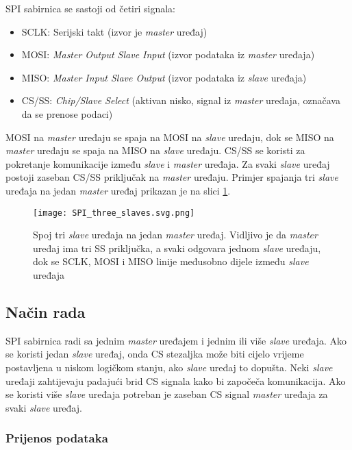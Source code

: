 SPI sabirnica se sastoji od četiri signala:
\begin{itemize}
	\item SCLK: Serijski takt (izvor je \textit{master} uređaj)
	\item MOSI: \textit{Master Output Slave Input} (izvor podataka iz \textit{master} uređaja)
	\item MISO: \textit{Master Input Slave Output} (izvor podataka iz \textit{slave} uređaja)
	\item CS/SS: \textit{Chip/Slave Select} (aktivan nisko, signal iz \textit{master} uređaja, označava da se prenose podaci)
\end{itemize}
MOSI na \textit{master} uređaju se spaja na MOSI na \textit{slave} uređaju, dok se MISO na \textit{master} uređaju se spaja na MISO na \textit{slave} uređaju. CS/SS se koristi za pokretanje komunikacije između \textit{slave} i \textit{master} uređaja. Za svaki \textit{slave} uređaj postoji zaseban CS/SS priključak na \textit{master} uređaju. Primjer spajanja tri \textit{slave} uređaja na jedan \textit{master} uređaj prikazan je na slici \ref{fig:spi_three_slaves}.
\begin{figure}[H]
	\centering
	\texttt{[image: SPI\_three\_slaves.svg.png]}
	\caption{Spoj tri \textit{slave} uređaja na jedan \textit{master} uređaj. Vidljivo je da \textit{master} uređaj ima tri SS priključka, a svaki odgovara jednom \textit{slave} uređaju, dok se SCLK, MOSI i MISO linije međusobno dijele između \textit{slave} uređaja \cite{spi_wikipedia}}
	\label{fig:spi_three_slaves}
\end{figure}

\subsection{Način rada}

SPI sabirnica radi sa jednim \textit{master} uređajem i jednim ili više \textit{slave} uređaja. Ako se koristi jedan \textit{slave} uređaj, onda CS stezaljka može biti cijelo vrijeme postavljena u niskom logičkom stanju, ako \textit{slave} uređaj to dopušta. Neki \textit{slave} uređaji zahtijevaju padajući brid CS signala kako bi započeča komunikacija. Ako se koristi više \textit{slave} uređaja potreban je zaseban CS signal \textit{master} uređaja za svaki \textit{slave} uređaj.

\subsubsection{Prijenos podataka}

